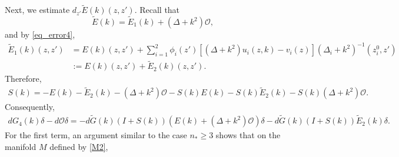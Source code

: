 \documentclass[12pt]{amsart}
\begin{document}
Next, we estimate \( d_{z'}\tilde{E}(k)(z,z') \). Recall that
\[
\tilde{E}(k) = \tilde{E}_1(k) + (\Delta + k^2)\mathcal{O},
\]
and by \eqref{eq_error4},
\begin{align*}
    \tilde{E}_1(k)(z,z') &= E(k)(z,z') + \sum_{i=1}^2 \phi_i(z') \left[ (\Delta + k^2) u_i(z,k) - v_i(z) \right] (\Delta_i + k^2)^{-1}(z_i^0, z') \\
    &:= E(k)(z,z') + \tilde{E}_2(k)(z,z').
\end{align*}
Therefore,
\begin{align*}
    S(k) = -E(k) - \tilde{E}_2(k) - (\Delta + k^2)\mathcal{O} - S(k)E(k) - S(k)\tilde{E}_2(k) - S(k)(\Delta + k^2)\mathcal{O}.
\end{align*}
Consequently,
\begin{align}\label{G4_decomposition}
    dG_4(k)\delta - d\mathcal{O}\delta = - d\tilde{G}(k)(I + S(k)) \left(E(k) + (\Delta + k^2)\mathcal{O}\right)\delta - d\tilde{G}(k)(I + S(k))\tilde{E}_2(k)\delta.
\end{align}
For the first term, an argument similar to the case \( n_* \ge 3 \) shows that on the manifold \( M \) defined by \eqref{M2},
\end{document}
